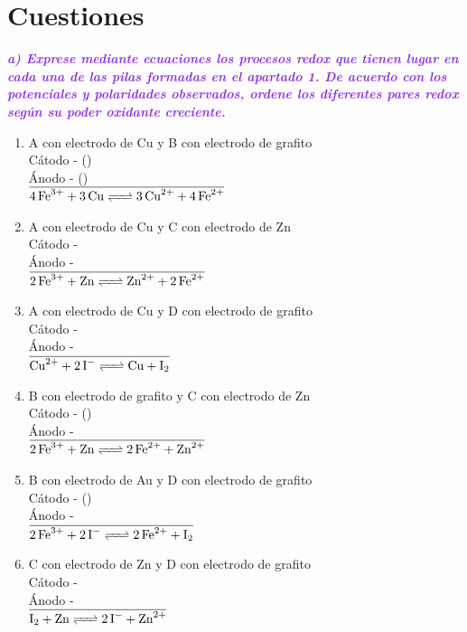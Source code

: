 \clearpage
\section{Cuestiones}
\noindent\textcolor{BlueViolet}{\textbf{\textit{a) Exprese mediante ecuaciones los procesos redox que tienen lugar en cada una de las pilas formadas en el apartado 1. De acuerdo con los potenciales y polaridades observados, ordene los diferentes pares redox según su poder oxidante creciente.}}}\\
\begin{enumerate}
\item A con electrodo de Cu y B con electrodo de grafito \\
    Cátodo - () \\
    Ánodo  - () \\
    $\overline{\ce{4Fe^{3+} + 3Cu <=> 3Cu^{2+} + 4Fe^{2+}}}$
\item A con electrodo de Cu y C con electrodo de Zn \\
    Cátodo -  \\
    Ánodo  -  \\
    $\overline{\ce{2Fe^{3+} + Zn <=> Zn^{2+} + 2Fe^{2+}}}$
\item A con electrodo de Cu y D con electrodo de grafito \\
    Cátodo -  \\
    Ánodo  -  \\
    $\overline{\ce{Cu^{2+} + 2I^- <=> Cu + I2}}$
\item B con electrodo de grafito y C con electrodo de Zn \\
    Cátodo - () \\
    Ánodo  -  \\
    $\overline{\ce{2Fe^{3+} + Zn <=> 2Fe^{2+} + Zn^{2+}}}$
\item B con electrodo de Au y D con electrodo de grafito \\
    Cátodo - () \\
    Ánodo  -  \\
    $\overline{\ce{2Fe^{3+} + 2I^- <=> 2Fe^{2+} + I2}}$
\item C con electrodo de Zn y D con electrodo de grafito \\
    Cátodo -  \\
    Ánodo  -  \\
    $\overline{\ce{I2 + Zn <=> 2I^- + Zn^{2+}}}$
\end{enumerate}
\clearpage

